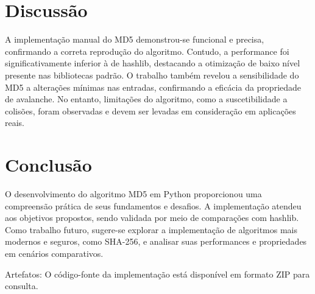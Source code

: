 \documentclass{article}
\begin{document}
\section{Discussão}
A implementação manual do MD5 demonstrou-se funcional e precisa, confirmando a correta reprodução do algoritmo. Contudo, a performance foi significativamente inferior à de hashlib, destacando a otimização de baixo nível presente nas bibliotecas padrão. O trabalho também revelou a sensibilidade do MD5 a alterações mínimas nas entradas, confirmando a eficácia da propriedade de avalanche. No entanto, limitações do algoritmo, como a suscetibilidade a colisões, foram observadas e devem ser levadas em consideração em aplicações reais.

\section{Conclusão}
O desenvolvimento do algoritmo MD5 em Python proporcionou uma compreensão prática de seus fundamentos e desafios. A implementação atendeu aos objetivos propostos, sendo validada por meio de comparações com hashlib. Como trabalho futuro, sugere-se explorar a implementação de algoritmos mais modernos e seguros, como SHA-256, e analisar suas performances e propriedades em cenários comparativos.

Artefatos: O código-fonte da implementação está disponível em formato ZIP para consulta.
\end{document}
